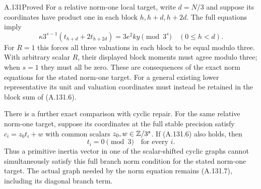 \begin{statement}{A.131}{Proved}
For a relative norm-one local target, write \(d=N/3\)
and suppose its coordinates have product one in each
block \(h,h+d,h+2d\).  The full equations imply
\[
   \kappa3^{s-1}
          (t_{h+d}+2t_{h+2d})=3e^2ky\pmod{3^s}
                                \quad(0\le h<d).
 \tag{A.131.9}
\]
For \(R=1\) this forces all three valuations in each
block to be equal modulo three.  With arbitrary scalar
\(R\), their displayed block moments must agree modulo
three; when \(s=1\) they must all be zero.
These are consequences of the exact norm equations for
the stated norm-one target.  For a general existing
lower representative its unit and valuation coordinates
must instead be retained in the block sum of (A.131.6).

There is a further exact comparison with cyclic repair.
For the same relative norm-one target, suppose its
coordinates at the full stable precision satisfy
\(c_i=z_0t_i+w\) with common scalars \(z_0,w\in\mathbb Z/3^s\).
If (A.131.6) also holds, then
\[
                           t_i=0\pmod3\quad\text{for every }i.
 \tag{A.131.14}
\]
Thus a primitive inertia vector in one of the scalar-shifted
cyclic graphs cannot simultaneously satisfy this full
branch norm condition for the stated norm-one target.
The actual graph needed by the norm equation remains
(A.131.7), including its diagonal branch term.
\end{statement}

